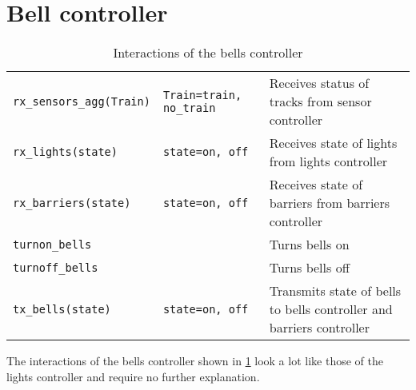 \documentclass[final]{report}
\begin{document}
\section{Bell controller}
\begin{table}[H]
\centering
    \begin{tabular}{|l|l|l|}
    \hline
    \texttt{rx\_sensors\_agg(Train)} & \texttt{Train=train, no\_train} & Receives status of tracks from sensor controller                     \\
    \texttt{rx\_lights(state)}       & \texttt{state=on, off}          & Receives state of lights from lights controller                      \\
    \texttt{rx\_barriers(state)}     & \texttt{state=on, off}          & Receives state of barriers from barriers controller                  \\ \hline
    \texttt{turnon\_bells}           &                                 & Turns bells on                                                       \\
    \texttt{turnoff\_bells}          &                                 & Turns bells off                                                      \\
    \texttt{tx\_bells(state)}        & \texttt{state=on, off}          & Transmits state of bells to bells controller and barriers controller \\ \hline
    \end{tabular}
\caption{Interactions of the bells controller}
\label{tab:bellsSignals}
\end{table}

The interactions of the bells controller shown in \cref{tab:bellsSignals} look a lot like those of the lights controller and require no further explanation.
\end{document}
